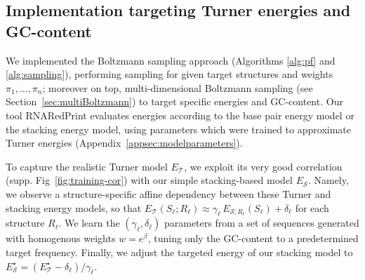 \documentclass{bioinfo}
\newcommand{\Nuc}[1]{{\sf #1}}
\newcommand{\Cb}{\Nuc{C}}
\newcommand{\Gb}{\Nuc{G}}
\newcommand{\Software}[1]{{\ttfamily #1}}
\newcommand{\ourprog}{\Software{RNARedPrint}}
\begin{document}
\subsection{Implementation targeting Turner energies and GC-content}
We implemented the Boltzmann sampling approach (Algorithms
\ref{alg:pf} and \ref{alg:sampling}), performing sampling for given
target structures and weights $\pi_1,\dots,\pi_n$; moreover on top,
multi-dimensional Boltzmann sampling (see
Section~\ref{sec:multiBoltzmann}) to target specific energies and
\Gb\Cb-content.  Our tool \ourprog{} evaluates energies according to the base
pair energy model or the stacking energy model, using parameters which
were trained to approximate Turner energies
(Appendix~\ref{appsec:modelparameters}).
%
%

To capture the realistic Turner model $E_{\mathcal{T}}$, we exploit its very good correlation (supp. Fig~\ref{fig:training-cor}) with our simple stacking-based model $E_{\mathcal{S}}$. Namely, we observe a structure-specific affine dependency between these Turner and stacking energy models, so that $E_{\mathcal{T}}(S_\ell;R_\ell) \approx \gamma_\ell\, E_{\mathcal{S};R_\ell}(S_\ell) + \delta_\ell$ for each structure $R_\ell$. We learn the $(\gamma_\ell,\delta_\ell)$ parameters from a set of sequences generated with homogenous weights $w=e^{\beta}$, tuning only the \Gb\Cb-content to a predetermined target frequency.  Finally, we adjust the targeted energy of our stacking model to $E_{\mathcal{S}}^{\star} = (E_{\mathcal{T}}^{\star}- \delta_\ell)/\gamma_\ell$.
\end{document}
